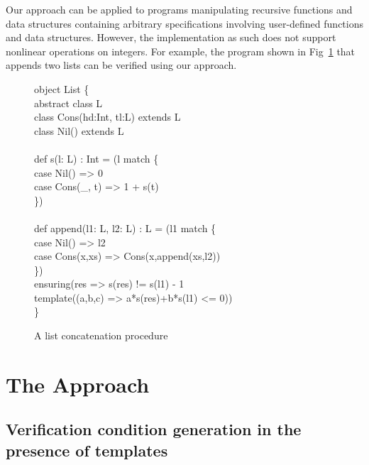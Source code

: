 \documentclass[a4paper,10pt]{article}
\begin{document}
Our approach can be applied to programs manipulating recursive functions and data structures containing arbitrary specifications involving user-defined functions and data structures. However, the implementation as such does not support nonlinear operations on integers. For example, the program shown in Fig~\ref{fig:eg2} that appends two
lists can be verified using our approach. 
%
\begin{figure}
\begin{myprogram}
object List \{ \\
\pnl \> abstract class L \\
\pnl \> class Cons(hd:Int, tl:L) extends L \\
\pnl \> class Nil() extends L \\
\\
\pnl \> def s(l: L) : Int = (l match \{ \\
\pnl \> \> case Nil() => 0 \\
\pnl \> \> case Cons(\_, t) => 1 + s(t) \\
\pnl \>\}) \\
\\
\pnl \> def append(l1: L, l2: L) : L = (l1 match \{ \\
\pnl \> \> case Nil() => l2 \\
\pnl \> \> case Cons(x,xs) => Cons(x,append(xs,l2)) \\
\pnl \> \}) \\ 
\pnl \> ensuring(res => s(res) != s(l1) - 1 \\
\pnl \> \> \> template((a,b,c) => a*s(res)+b*s(l1) <= 0)) \\
\}
\end{myprogram}
\caption{A list concatenation procedure} \label{fig:eg2}
\end{figure}

\section{The Approach}

\subsection{Verification condition generation in the presence of templates}
\end{document}
